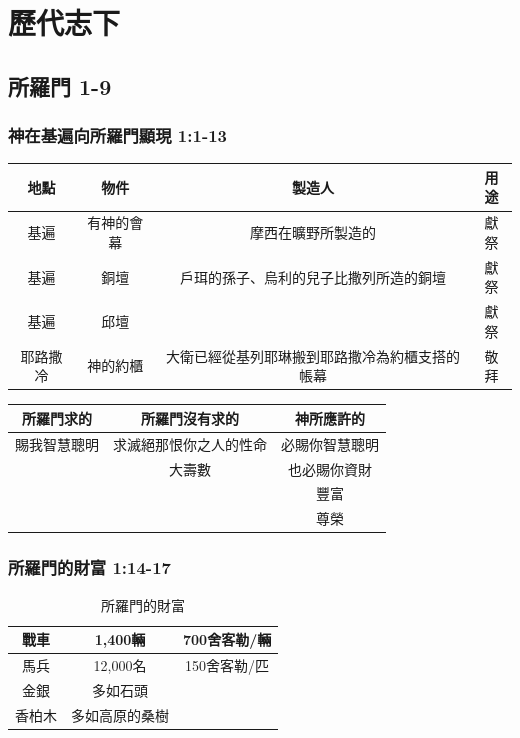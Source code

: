 
\chapter{歷代志下} 
\section{所羅門 1-9 }
\subsection{神在基遍向所羅門顯現 1:1-13 }

\begin{table}[H]
\centering
\begin{tabular}{c|c|c|c}
\hline
\hline
地點     &物件 &製造人 &用途 \\\hline\hline
基遍     & 有神的會幕&摩西在曠野所製造的 & 獻祭 \\\hline
基遍     & 銅壇&戶珥的孫子、烏利的兒子比撒列所造的銅壇&獻祭 \\\hline
基遍     & 邱壇 &  &獻祭\\\hline
耶路撒冷 & 神的約櫃&大衛已經從基列耶琳搬到耶路撒冷為約櫃支搭的帳幕&敬拜  \\\hline
\end{tabular}
\end{table}

\begin{table}[H]
\centering
\begin{tabular}{c|c|c}
\hline
\hline
所羅門求的    &所羅門沒有求的         &神所應許的 \\\hline\hline
賜我智慧聰明  & 求滅絕那恨你之人的性命&必賜你智慧聰明 \\\hline
              & 大壽數                & 也必賜你資財 \\\hline
              &                         &豐富\\\hline
		        &                       &尊榮  \\\hline
\end{tabular}
\end{table}


\subsection{所羅門的財富 1:14-17 }

\begin{table}[H]
\centering
\begin{tabular}{c|c|c}
\hline
\hline
戰車    &1,400輛      &700舍客勒/輛 \\\hline\hline
馬兵  & 12,000名 &150舍客勒/匹 \\\hline
金銀              & 多如石頭                &   \\\hline
香柏木              & 多如高原的桑樹                        & \\\hline
\end{tabular}
\caption{所羅門的財富}
\end{table}

